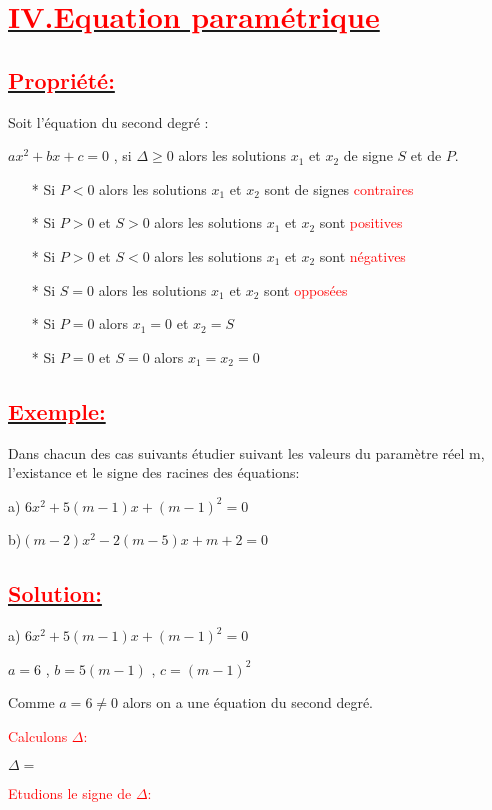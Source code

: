 \documentclass[12pt]{article}
\begin{document}
\section*{\underline{\textbf{\textcolor{red}{IV.Equation paramétrique}}}}
\subsection*{\underline{\textbf{\textcolor{red}{Propriété:}}}}
Soit l'équation du second degré : 

$ax^{2}+bx+c=0$ , si $\Delta \geq 0$ alors les solutions $x_{1}$ et $x_{2}$ de signe $S$ et de $P$.
\begin{itemize}
\item[*] Si $P < 0$ alors les solutions $x_{1}$ et $x_{2}$ sont de signes \textcolor{red}{contraires}
\item[*] Si $P>0$ et $S>0$ alors les solutions $x_{1}$ et $x_{2}$ sont  \textcolor{red}{positives}
\item[*] Si $P>0$ et $S<0$ alors les solutions $x_{1}$ et $x_{2}$ sont  \textcolor{red}{négatives}
\item[*] Si $S=0$ alors les solutions $x_{1}$ et $x_{2}$ sont  \textcolor{red}{opposées}
\item[*] Si $P=0$  alors $x_{1}=0$ et $x_{2}=S$
\item[*] Si $P=0$ et $S=0$ alors  $x_{1}=x_{2}=0$
\end{itemize}
\subsection*{\underline{\textbf{\textcolor{red}{Exemple:}}}}
Dans chacun des cas suivants étudier suivant les valeurs du paramètre réel m, l'existance et le signe des racines des équations:

a)
$6x^{2}+5(m-1)x+(m-1)^{2}=0$

b)$(m-2)x^{2}-2(m-5)x+m+2=0$
\subsection*{\underline{\textbf{\textcolor{red}{Solution:}}}}
a)
$6x^{2}+5(m-1)x+(m-1)^{2}=0$

$a=6$ , $b=5(m-1)$ , $c=(m-1)^{2}$

Comme $a=6\neq 0$ alors on a une équation du second degré.

\textcolor{red}{Calculons $\Delta$:}

$\Delta=$

\textcolor{red}{Etudions le signe de $\Delta$:}
\end{document}
